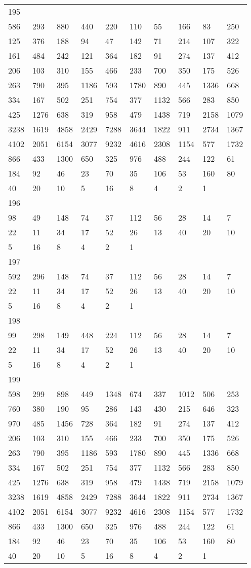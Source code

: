 \begin{longtable}{*{10}{l}}
195&&&&&&&&&\\
586& 293& 880& 440& 220& 110& 55& 166& 83& 250\\
125& 376& 188& 94& 47& 142& 71& 214& 107& 322\\
161& 484& 242& 121& 364& 182& 91& 274& 137& 412\\
206& 103& 310& 155& 466& 233& 700& 350& 175& 526\\
263& 790& 395& 1186& 593& 1780& 890& 445& 1336& 668\\
334& 167& 502& 251& 754& 377& 1132& 566& 283& 850\\
425& 1276& 638& 319& 958& 479& 1438& 719& 2158& 1079\\
3238& 1619& 4858& 2429& 7288& 3644& 1822& 911& 2734& 1367\\
4102& 2051& 6154& 3077& 9232& 4616& 2308& 1154& 577& 1732\\
866& 433& 1300& 650& 325& 976& 488& 244& 122& 61\\
184& 92& 46& 23& 70& 35& 106& 53& 160& 80\\
40& 20& 10& 5& 16& 8& 4& 2& 1& \\

196&&&&&&&&&\\
98& 49& 148& 74& 37& 112& 56& 28& 14& 7\\
22& 11& 34& 17& 52& 26& 13& 40& 20& 10\\
5& 16& 8& 4& 2& 1& \\

197&&&&&&&&&\\
592& 296& 148& 74& 37& 112& 56& 28& 14& 7\\
22& 11& 34& 17& 52& 26& 13& 40& 20& 10\\
5& 16& 8& 4& 2& 1& \\

198&&&&&&&&&\\
99& 298& 149& 448& 224& 112& 56& 28& 14& 7\\
22& 11& 34& 17& 52& 26& 13& 40& 20& 10\\
5& 16& 8& 4& 2& 1& \\

199&&&&&&&&&\\
598& 299& 898& 449& 1348& 674& 337& 1012& 506& 253\\
760& 380& 190& 95& 286& 143& 430& 215& 646& 323\\
970& 485& 1456& 728& 364& 182& 91& 274& 137& 412\\
206& 103& 310& 155& 466& 233& 700& 350& 175& 526\\
263& 790& 395& 1186& 593& 1780& 890& 445& 1336& 668\\
334& 167& 502& 251& 754& 377& 1132& 566& 283& 850\\
425& 1276& 638& 319& 958& 479& 1438& 719& 2158& 1079\\
3238& 1619& 4858& 2429& 7288& 3644& 1822& 911& 2734& 1367\\
4102& 2051& 6154& 3077& 9232& 4616& 2308& 1154& 577& 1732\\
866& 433& 1300& 650& 325& 976& 488& 244& 122& 61\\
184& 92& 46& 23& 70& 35& 106& 53& 160& 80\\
40& 20& 10& 5& 16& 8& 4& 2& 1& \\


\end{longtable}
